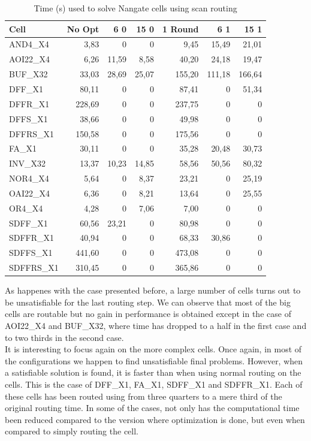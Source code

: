 \begin{table}
\centering
\begin{tabular}{|l|r|r|r|r|r|r|}
\cline{1-7}
Cell & No Opt & 6 0 & 15 0 & 1 Round & 6 1 & 15 1 \\ \hline \cline{1-7}
AND4\_X4 & 3,83 & 0 & 0 & 9,45 & 15,49 & 21,01  \\ \hline
AOI22\_X4 & 6,26 & 11,59 & 8,58 & 40,20 & 24,18 & 19,47  \\ \hline
BUF\_X32 & 33,03 & 28,69 & 25,07 & 155,20 & 111,18 & 166,64  \\ \hline
DFF\_X1 & 80,11 & 0 & 0 & 87,41 & 0 & 51,34  \\ \hline
DFFR\_X1 & 228,69 & 0 & 0 & 237,75 & 0 & 0  \\ \hline
DFFS\_X1 & 38,66 & 0 & 0 & 49,98 & 0 & 0 \\ \hline
DFFRS\_X1 & 150,58 & 0 & 0 & 175,56 & 0 & 0  \\ \hline
FA\_X1 & 30,11 & 0 & 0 & 35,28 & 20,48 & 30,73  \\ \hline
INV\_X32 & 13,37 & 10,23 & 14,85 & 58,56 & 50,56 & 80,32  \\ \hline
NOR4\_X4 & 5,64 & 0 & 8,37 & 23,21 & 0 & 25,19  \\ \hline
OAI22\_X4 & 6,36 & 0 & 8,21 & 13,64 & 0 & 25,55  \\ \hline
OR4\_X4 & 4,28 & 0 & 7,06 & 7,00 & 0 & 0  \\ \hline
SDFF\_X1 & 60,56 & 23,21 & 0 & 80,98 & 0 & 0  \\ \hline 
SDFFR\_X1 & 40,94 & 0 & 0 & 68,33 & 30,86 & 0  \\ \hline 
SDFFS\_X1 & 441,60 & 0 & 0 & 473,08 & 0 & 0  \\ \hline
SDFFRS\_X1 & 310,45 & 0 & 0 & 365,86 & 0 & 0  \\ \hline \cline{1-7}
\end{tabular} 
\caption{Time (s) used to solve Nangate cells using scan routing}
\label{tab:scan_nangate}
\end{table}

As happenes with the case presented before, a large number of cells turns out to be unsatisfiable for the last routing step. We can observe that most of the big cells are routable but no gain in performance is obtained except in the case of AOI22\_X4 and BUF\_X32, where time has dropped to a half in the first case and to two thirds in the second case. \\

It is interesting to focus again on the more complex cells. Once again, in most of the configurations we happen to find unsatisfiable final problems. However, when a satisfiable solution is found, it is faster than when using normal routing on the cells. This is the case of DFF\_X1, FA\_X1, SDFF\_X1 and SDFFR\_X1. Each of these cells has been routed using from three quarters to a mere third of the original routing time. In some of the cases, not only has the computational time been reduced compared to the version where optimization is done, but even when compared to simply routing the cell. \\


